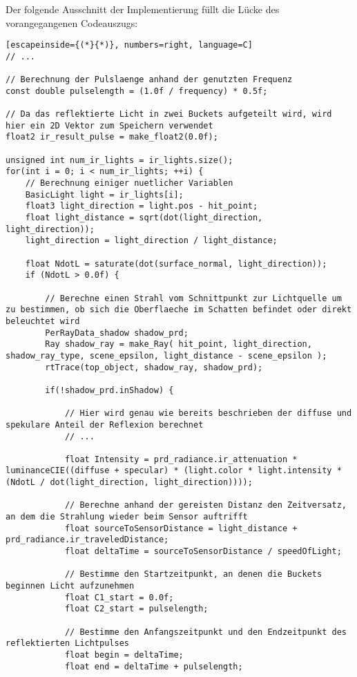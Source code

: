 \documentclass[thesis.tex]{subfiles}
\begin{document}
Der folgende Ausschnitt der Implementierung füllt die Lücke des vorangegangenen Codeauszugs:
%
\begin{lstlisting}[escapeinside={(*}{*)}, numbers=right, language=C]
// ...

// Berechnung der Pulslaenge anhand der genutzten Frequenz
const double pulselength = (1.0f / frequency) * 0.5f;

// Da das reflektierte Licht in zwei Buckets aufgeteilt wird, wird hier ein 2D Vektor zum Speichern verwendet
float2 ir_result_pulse = make_float2(0.0f);

unsigned int num_ir_lights = ir_lights.size();
for(int i = 0; i < num_ir_lights; ++i) {
    // Berechnung einiger nuetlicher Variablen
    BasicLight light = ir_lights[i];
    float3 light_direction = light.pos - hit_point;
    float light_distance = sqrt(dot(light_direction, light_direction));
    light_direction = light_direction / light_distance;

    float NdotL = saturate(dot(surface_normal, light_direction));
    if (NdotL > 0.0f) {

        // Berechne einen Strahl vom Schnittpunkt zur Lichtquelle um zu bestimmen, ob sich die Oberflaeche im Schatten befindet oder direkt beleuchtet wird
        PerRayData_shadow shadow_prd;
        Ray shadow_ray = make_Ray( hit_point, light_direction, shadow_ray_type, scene_epsilon, light_distance - scene_epsilon );
        rtTrace(top_object, shadow_ray, shadow_prd);

        if(!shadow_prd.inShadow) {

            // Hier wird genau wie bereits beschrieben der diffuse und spekulare Anteil der Reflexion berechnet
            // ...
            
            float Intensity = prd_radiance.ir_attenuation * luminanceCIE((diffuse + specular) * (light.color * light.intensity * (NdotL / dot(light_direction, light_direction))));

            // Berechne anhand der gereisten Distanz den Zeitversatz, an dem die Strahlung wieder beim Sensor auftrifft 
            float sourceToSensorDistance = light_distance + prd_radiance.ir_traveledDistance;
            float deltaTime = sourceToSensorDistance / speedOfLight;

            // Bestimme den Startzeitpunkt, an denen die Buckets beginnen Licht aufzunehmen
            float C1_start = 0.0f;
            float C2_start = pulselength;
            
            // Bestimme den Anfangszeitpunkt und den Endzeitpunkt des reflektierten Lichtpulses
            float begin = deltaTime;
            float end = deltaTime + pulselength;


\end{lstlisting}
\end{document}
